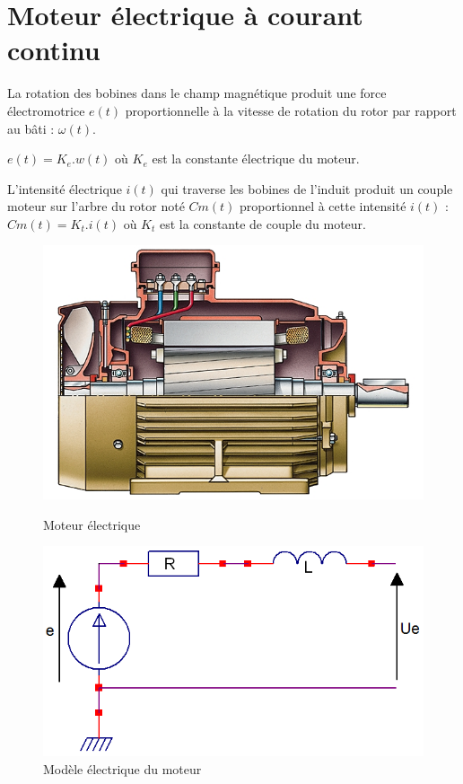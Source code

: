 \newpage

\section{Moteur électrique à courant continu}

La rotation des bobines dans le champ magnétique produit une force électromotrice $e(t)$ proportionnelle à la vitesse de rotation du rotor par rapport au bâti : $\omega(t)$.

$e(t)=K_e.w(t)$ où $K_e$ est la constante électrique du moteur.

L'intensité électrique $i(t)$ qui traverse les bobines de l'induit produit un couple moteur sur l'arbre du rotor noté $Cm(t)$ proportionnel à cette intensité $i(t)$ : $Cm(t)=K_t.i(t)$ où $K_t$ est la constante de 
couple du moteur. 

\begin{figure}[htbp]
\begin{minipage}[c]{.48\linewidth}
\begin{center}
\includegraphics[width=0.8\linewidth]{img/moteur.jpg}
\caption{Moteur électrique}
\label{fig:image8}
\end{center}
\end{minipage}
\hfill
\begin{minipage}[c]{.50\linewidth}
\begin{center}
\includegraphics[width=0.8\linewidth]{img/moteur_s.png}
\caption{Modèle électrique du moteur}
\label{fig:image9}
\end{center}
\end{minipage}
\end{figure}

